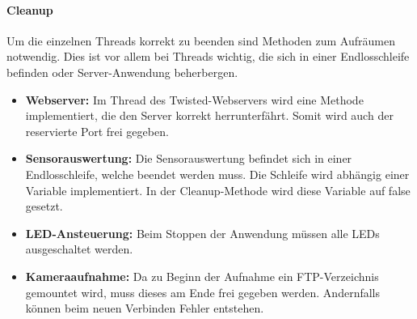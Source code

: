 \paragraph{Cleanup}
Um die einzelnen Threads korrekt zu beenden sind Methoden zum Aufräumen notwendig. Dies ist vor allem bei Threads wichtig, die sich in einer Endlosschleife befinden oder Server-Anwendung beherbergen. 
\begin{itemize}
	\item \textbf{Webserver:} Im Thread des Twisted-Webservers wird eine Methode implementiert, die den Server korrekt herrunterfährt. Somit wird auch der reservierte Port frei gegeben. 
	\item \textbf{Sensorauswertung:} Die Sensorauswertung befindet sich in einer Endlosschleife, welche beendet werden muss. Die Schleife wird abhängig einer Variable implementiert. In der Cleanup-Methode wird diese Variable auf false gesetzt. 
	\item \textbf{LED-Ansteuerung:} Beim Stoppen der Anwendung müssen alle LEDs ausgeschaltet werden. 
	\item \textbf{Kameraaufnahme:} Da zu Beginn der Aufnahme ein FTP-Verzeichnis gemountet wird, muss dieses am Ende frei gegeben werden. Andernfalls können beim neuen Verbinden Fehler entstehen.
\end{itemize}